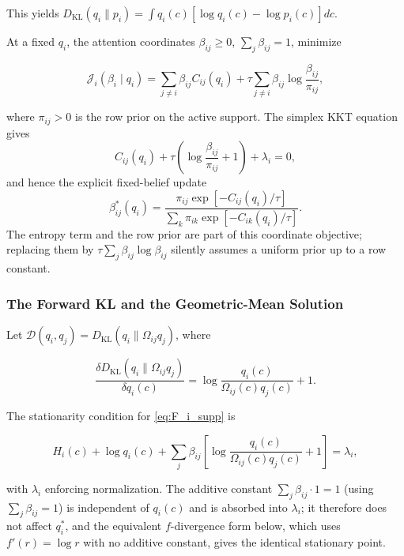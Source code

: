\documentclass[twoside,11pt]{article}
\begin{document}
This yields $D_{\mathrm{KL}}(q_i \| p_i) = \int q_i(c)[\log q_i(c) - \log p_i(c)] dc$.

At a fixed $q_i$, the attention coordinates $\beta_{ij}\ge 0$, $\sum_j\beta_{ij}=1$, minimize

\begin{equation}
\mathcal{J}_i(\beta_i\mid q_i)
=\sum_{j\neq i}\beta_{ij} C_{ij}(q_i)
+ \tau \sum_{j\neq i}\beta_{ij}\log\frac{\beta_{ij}}{\pi_{ij}},
\label{eq:J_i_supp}
\end{equation}

where $\pi_{ij}>0$ is the row prior on the active support. The simplex KKT equation gives
\begin{equation}
C_{ij}(q_i)+\tau\left(\log\frac{\beta_{ij}}{\pi_{ij}}+1\right)+\lambda_i=0,
\end{equation}
and hence the explicit fixed-belief update
\begin{equation}
\beta_{ij}^*(q_i)
=\frac{\pi_{ij}\exp[-C_{ij}(q_i)/\tau]}
{\sum_k\pi_{ik}\exp[-C_{ik}(q_i)/\tau]}.
\label{eq:beta_fixed_q_supp}
\end{equation}
The entropy term and the row prior are part of this coordinate objective; replacing them by $\tau\sum_j\beta_{ij}\log\beta_{ij}$ silently assumes a uniform prior up to a row constant.

\subsubsection{The Forward KL and the Geometric-Mean Solution}
Let $\mathcal{D}(q_i,q_j) = D_{\mathrm{KL}}(q_i \| \Omega_{ij} q_j)$, where

\[
\frac{\delta D_{\mathrm{KL}}(q_i \| \Omega_{ij} q_j)}{\delta q_i(c)}
= \log\frac{q_i(c)}{\Omega_{ij}(c) q_j(c)} + 1.
\]

The stationarity condition for \eqref{eq:F_i_supp} is

\begin{equation}
H_i(c)
+ \log q_i(c)
+ \sum_j \beta_{ij}
 \left[
\log\frac{q_i(c)}{\Omega_{ij}(c)q_j(c)}+1
\right]
= \lambda_i,
\end{equation}

with $\lambda_i$ enforcing normalization. The additive constant $\sum_j \beta_{ij} \cdot 1 = 1$ (using $\sum_j \beta_{ij} = 1$) is independent of $q_i(c)$ and is absorbed into $\lambda_i$; it therefore does not affect $q_i^*$, and the equivalent $f$-divergence form below, which uses $f'(r) = \log r$ with no additive constant, gives the identical stationary point.
\end{document}

